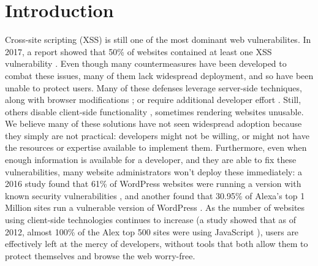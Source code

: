 \section{Introduction}

Cross-site scripting (XSS) is still one of the most dominant web vulnerabilites. In 2017, a report showed that 50\% of websites contained at least one XSS vulnerability \cite{Acunetix}. Even though many countermeasures have been developed to combat these issues, many of them lack widespread deployment, and so have been unable to protect users. Many of these defenses leverage server-side techniques, along with browser modifications \cite{Jim:2007:DSI:1242572.1242654,Nadji:2009}; or require additional developer effort \cite{10.1007/978-3-319-66399-9_7}. Still, others disable client-side functionality \cite{Noscript,Snyder:2017:MWD:3133956.3133966}, sometimes rendering websites unusable. We believe many of these solutions have not seen widespread adoption because they simply are not practical: developers might not be willing, or might not have the resources or expertise available to implement them. Furthermore, even when enough information is available for a developer, and they are able to fix these vulnerabilities, many website administrators won't deploy these immediately: a 2016 study found that 61\% of WordPress websites were running a version with known security vulnerabilities \cite{Sucuri}, and another found that 30.95\% of Alexa's top 1 Million sites run a vulnerable version of WordPress \cite{wpwhitesecurity}. As the number of websites using client-side technologies continues to increase (a study showed that as of 2012, almost 100\% of the Alex top 500 sites were using JavaScript \cite{Stock:2017:WTI:3241189.3241265}), users are effectively left at the mercy of developers, without tools that both allow them to protect themselves and browse the web worry-free.

